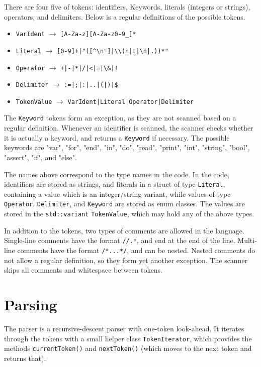 \documentclass[a4paper]{article}
\newcommand*{\code}[1]{\texttt{#1}}
\begin{document}
There are four five of tokens: identifiers, Keywords, 
literals (integers or strings), operators, and delimiters.
Below is a regular definitions of the possible tokens. 
\begin{itemize}
  \item[] \code{VarIdent} $\rightarrow$ \verb?[A-Za-z][A-Za-z0-9_]*?
  \item[] \code{Literal} $\rightarrow$ \verb_[0-9]+|"([^\n"]|\\(n|t|\n|.))*"_
  \item[] \code{Operator} $\rightarrow$ \verb_+|-|*|/|<|=|\&|!_
  \item[] \code{Delimiter} $\rightarrow$ \verb_:=|;|:|..|(|)|$_
  \item[] \code{TokenValue} $\rightarrow$ \verb_VarIdent|Literal|Operator|Delimiter_
\end{itemize}
The \code{Keyword} tokens form an exception, as they are not scanned 
based on a regular definition. Whenever an identifier is scanned, 
the scanner checks whether it is actually a keyword, and returns 
a \code{Keyword} if necessary.
The possible keywords are  "var", "for", "end", "in", "do", "read", "print", 
"int", "string", "bool", "assert", "if", and "else".

The names above correspond to the type names in the code.  
In the code, identifiers are stored as strings, and literals in a 
struct of type \code{Literal}, containing a value which is 
an integer/string variant, while
values of type \code{Operator}, \code{Delimiter}, and \code{Keyword} 
are stored as enum classes.
The values are stored in the \code{std::variant}
\code{TokenValue}, which may hold any of the above types. 

In addition to the tokens, two types of comments are allowed in 
the language. Single-line comments have the format \verb_//.*_, 
and end at the end of the line. Multi-line comments have the format
\verb_/*...*/_, and can be nested. Nested comments do not allow 
a regular definition, so they form yet another exception. The 
scanner skips all comments and whitespace between tokens.



\section{Parsing}

The parser is a recursive-descent parser with one-token look-ahead.
It iterates through the tokens with a small helper class 
\code{TokenIterator}, which provides the methods \code{currentToken()} 
and \code{nextToken()} (which moves to the next token and returns that).
\end{document}
